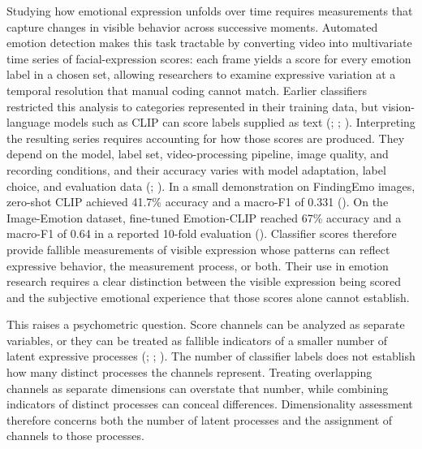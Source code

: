 \documentclass[
]{article}
\begin{document}
Studying how emotional expression unfolds over time requires
measurements that capture changes in visible behavior across successive
moments. Automated emotion detection makes this task tractable by
converting video into multivariate time series of facial-expression
scores: each frame yields a score for every emotion label in a chosen
set, allowing researchers to examine expressive variation at a temporal
resolution that manual coding cannot match. Earlier classifiers
restricted this analysis to categories represented in their training
data, but vision-language models such as CLIP can score labels supplied
as text (; ;
).
Interpreting the resulting series requires accounting for how those
scores are produced. They depend on the model, label set,
video-processing pipeline, image quality, and recording conditions, and
their accuracy varies with model adaptation, label choice, and
evaluation data (; ). In a
small demonstration on FindingEmo images, zero-shot CLIP achieved 41.7\%
accuracy and a macro-F1 of 0.331
().
On the Image-Emotion dataset, fine-tuned Emotion-CLIP reached 67\%
accuracy and a macro-F1 of 0.64 in a reported 10-fold evaluation
().
Classifier scores therefore provide fallible measurements of visible
expression whose patterns can reflect expressive behavior, the
measurement process, or both. Their use in emotion research requires a
clear distinction between the visible expression being scored and the
subjective emotional experience that those scores alone cannot
establish.

This raises a psychometric question. Score channels can be analyzed as
separate variables, or they can be treated as fallible indicators of a
smaller number of latent expressive processes
(;
;
). The number of
classifier labels does not establish how many distinct processes the
channels represent. Treating overlapping channels as separate dimensions
can overstate that number, while combining indicators of distinct
processes can conceal differences. Dimensionality assessment therefore
concerns both the number of latent processes and the assignment of
channels to those processes.
\end{document}

